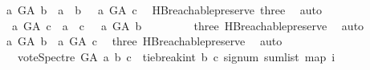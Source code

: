 \begin{isabellebody}
\ {\isachardoublequoteopen}{\isasymnot}{\isacharparenleft}{\kern0pt}{\isacharparenleft}{\kern0pt}a\ {\isasymrightarrow}\isactrlsup {\isacharplus}{\kern0pt}\isactrlbsub G{\isacharunderscore}{\kern0pt}A\isactrlesub \ b\ {\isasymor}\ a\ {\isacharequal}{\kern0pt}\ b{\isacharparenright}{\kern0pt}\ {\isasymand}\ {\isacharparenleft}{\kern0pt}{\isasymnot}\ a\ {\isasymrightarrow}\isactrlsup {\isacharplus}{\kern0pt}\isactrlbsub G{\isacharunderscore}{\kern0pt}A\isactrlesub \ c{\isacharparenright}{\kern0pt}{\isacharparenright}{\kern0pt}{\isachardoublequoteclose}\ \isamarkupfalse%
\ HB{}{\isachardot}{\kern0pt}reachable{}{\isacharunderscore}{\kern0pt}preserve\ three\ \isamarkupfalse%
\ auto\isanewline
\ \ \ \ \isamarkupfalse%
\ \isamarkupfalse%
\ {\isachardoublequoteopen}{\isasymnot}\ {\isacharparenleft}{\kern0pt}{\isacharparenleft}{\kern0pt}a\ {\isasymrightarrow}\isactrlsup {\isacharplus}{\kern0pt}\isactrlbsub G{\isacharunderscore}{\kern0pt}A\isactrlesub \ c\ {\isasymor}\ a\ {\isacharequal}{\kern0pt}\ c{\isacharparenright}{\kern0pt}\ {\isasymand}\ {\isacharparenleft}{\kern0pt}{\isasymnot}\ a\ {\isasymrightarrow}\isactrlsup {\isacharplus}{\kern0pt}\isactrlbsub G{\isacharunderscore}{\kern0pt}A\isactrlesub \ b{\isacharparenright}{\kern0pt}{\isacharparenright}{\kern0pt}{\isachardoublequoteclose}\ \isanewline
\ \ \ \ \ \ \isamarkupfalse%
\ three\ HB{}{\isachardot}{\kern0pt}reachable{}{\isacharunderscore}{\kern0pt}preserve\ \isamarkupfalse%
\ auto\isanewline
\ \ \ \ \isamarkupfalse%
\ \isamarkupfalse%
\ {\isachardoublequoteopen}a\ {\isasymrightarrow}\isactrlsup {\isacharplus}{\kern0pt}\isactrlbsub G{\isacharunderscore}{\kern0pt}A\isactrlesub \ b\ {\isasymand}\ a\ {\isasymrightarrow}\isactrlsup {\isacharplus}{\kern0pt}\isactrlbsub G{\isacharunderscore}{\kern0pt}A\isactrlesub \ c{\isachardoublequoteclose}\ \isamarkupfalse%
\ three\ HB{}{\isachardot}{\kern0pt}reachable{}{\isacharunderscore}{\kern0pt}preserve\ \isamarkupfalse%
\ auto\isanewline
\ \ \ \ \isamarkupfalse%
\ \isamarkupfalse%
\ \ {\isachardoublequoteopen}\ vote{\isacharunderscore}{\kern0pt}Spectre\ G{\isacharunderscore}{\kern0pt}A\ a\ b\ c\ {\isacharequal}{\kern0pt}\ {\isacharparenleft}{\kern0pt}tie{\isacharunderscore}{\kern0pt}break{\isacharunderscore}{\kern0pt}int\ b\ c\ {\isacharparenleft}{\kern0pt}signum\ {\isacharparenleft}{\kern0pt}sum{\isacharunderscore}{\kern0pt}list\ {\isacharparenleft}{\kern0pt}map\ {\isacharparenleft}{\kern0pt}{\isasymlambda}i{\isachardot}{\kern0pt}\isanewline

\end{isabellebody}
